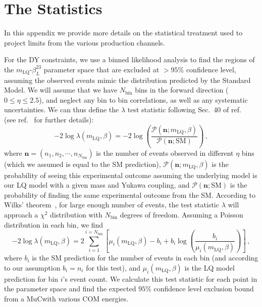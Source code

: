 \documentclass[a4paper,11pt]{article}
\newcommand{\muc}{MuC}
\begin{document}
\appendix 
 

\section{The Statistics}
\label{app:stats}

In this appendix we provide more details on the statistical treatment used to project limits from the various production channels.

For the DY constraints, we use a binned likelihood analysis to find the regions of the $m_{\textrm{LQ}}$-$\beta_L^{23}$ parameter space that are excluded at $> 95\%$ confidence level, assuming the observed events mimic the distribution predicted by the Standard Model. 
We will assume that we have $N_{\mathrm{bin}}$ bins in the forward direction ($0 \leq \eta \leq 2.5$), and neglect any bin to bin correlations, as well as any systematic uncertainties. 
We can thus define the $\lambda$ test statistic following Sec.~40 of ref.~\cite{Zyla:2020zbs} (see ref.~\cite{Cowan:1998ji, Cowan:2010js} for further details):
\begin{equation}
    -2 \log  \lambda(m_{\mathrm{LQ}},\beta) = -2 \log \left( \frac{\mathcal{P}(\mathbf{n};m_{\mathrm{LQ}},\beta)}{\mathcal{P}(\mathbf{n};\mathrm{SM})}\right) \, ,
    \label{eq:lambda_def}
\end{equation}
where $\mathbf{n}=(n_1, n_2, \cdots, n_{N_{\mathrm{bin}}})$ is the number of events observed in different $\eta$ bins (which we assumed is equal to the SM prediction), $\mathcal{P}(\mathbf{n};m_{\mathrm{LQ}},\beta)$ is the probability of seeing this experimental outcome assuming the underlying model is our LQ model with a given mass and Yukawa coupling, and $\mathcal{P}(\mathbf{n};\mathrm{SM})$ is the probability of finding the same experimental outcome from the SM. 
According to Wilks' theorem~\cite{Wilks:1938dza}, for large enough number of events, the test statistic $\lambda$ will approach a $\chi^2$ distribution with $N_{\mathrm{bin}}$ degrees of freedom. 
Assuming a Poisson distribution in each bin, we find
\begin{equation}
    -2 \log  \lambda(m_{\mathrm{LQ}},\beta) =  2 \sum_{i=1}^{i=N_{\mathrm{bin}}} \left[   \mu_i (m_{\mathrm{LQ}},\beta) - b_i + b_i \log \left( \frac{b_i}{\mu_i (m_{\mathrm{LQ}},\beta)}  \right)            \right]\, ,
    \label{eq:lambda_exclusion}
\end{equation}
where $b_i$ is the SM prediction for the number of events in each bin (and according to our assumption $b_i=n_i$ for this test), and $\mu_i (m_{\mathrm{LQ}},\beta)$ is the LQ model prediction for bin $i$'s event count. We calculate this test statistic for each point in the parameter space and find the expected $95\%$ confidence level exclusion bound from a \muc with various COM energies. 
\end{document}
